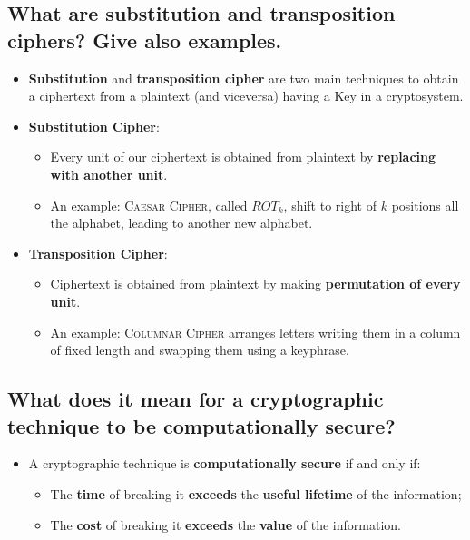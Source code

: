 \documentclass[9pt, letterpaper]{article}
\begin{document}
\subsection{What are substitution and transposition ciphers? Give also examples.}
\begin{itemize}
	\item \textbf{Substitution} and \textbf{transposition cipher} are two main techniques to obtain a ciphertext from a plaintext (and viceversa) having a Key in a cryptosystem.
	\item \textbf{Substitution Cipher}:
	      \begin{itemize}
		      \item Every unit of our ciphertext is obtained from plaintext by \textbf{replacing with another unit}.
		      \item An example: \textsc{Caesar Cipher}, called $ROT_k$, shift to right of $k$ positions all the alphabet, leading to another new alphabet.
	      \end{itemize}

	\item \textbf{Transposition Cipher}:
	      \begin{itemize}
		      \item Ciphertext is obtained from plaintext by making \textbf{permutation of every unit}.
		      \item An example: \textsc{Columnar Cipher} arranges letters writing them in a column of fixed length and swapping them using a keyphrase.

	      \end{itemize}
\end{itemize}

\subsection{What does it mean for a cryptographic technique to be computationally secure?}
\begin{itemize}
	\item A cryptographic technique is \textbf{computationally secure} if and only if:
	      \begin{itemize}
		      \item The \textbf{time} of breaking it \textbf{exceeds} the \textbf{useful lifetime} of the information;
		      \item The \textbf{cost} of breaking it \textbf{exceeds} the \textbf{value} of the information.
	      \end{itemize}
\end{itemize}
\end{document}
